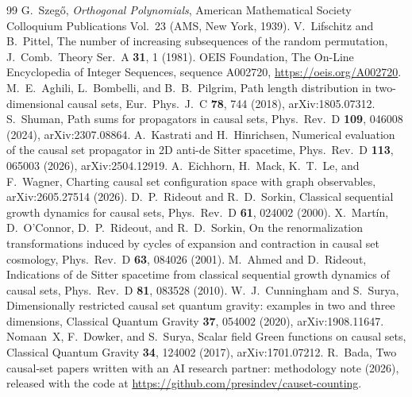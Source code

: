 \documentclass[prd,twocolumn,superscriptaddress,nofootinbib,amsmath,amssymb,floatfix]{revtex4-2}
\begin{document}
\begin{thebibliography}{99}
 G.~Szeg\H{o}, \emph{Orthogonal Polynomials}, American Mathematical Society Colloquium Publications Vol.~23 (AMS, New York, 1939).
 V.~Lifschitz and B.~Pittel, The number of increasing subsequences of the random permutation, J.\ Comb.\ Theory Ser.\ A \textbf{31}, 1 (1981).
 OEIS Foundation, The On-Line Encyclopedia of Integer Sequences, sequence A002720, \url{https://oeis.org/A002720}.
 M.~E.~Aghili, L.~Bombelli, and B.~B.~Pilgrim, Path length distribution in two-dimensional causal sets, Eur.\ Phys.\ J.\ C \textbf{78}, 744 (2018), arXiv:1805.07312.
 S.~Shuman, Path sums for propagators in causal sets, Phys.\ Rev.\ D \textbf{109}, 046008 (2024), arXiv:2307.08864.
 A.~Kastrati and H.~Hinrichsen, Numerical evaluation of the causal set propagator in 2D anti-de Sitter spacetime, Phys.\ Rev.\ D \textbf{113}, 065003 (2026), arXiv:2504.12919.
 A.~Eichhorn, H.~Mack, K.~T.~Le, and F.~Wagner, Charting causal set configuration space with graph observables, arXiv:2605.27514 (2026).
 D.~P.~Rideout and R.~D.~Sorkin, Classical sequential growth dynamics for causal sets, Phys.\ Rev.\ D \textbf{61}, 024002 (2000).
 X.~Mart\'in, D.~O'Connor, D.~P.~Rideout, and R.~D.~Sorkin, On the renormalization transformations induced by cycles of expansion and contraction in causal set cosmology, Phys.\ Rev.\ D \textbf{63}, 084026 (2001).
 M.~Ahmed and D.~Rideout, Indications of de Sitter spacetime from classical sequential growth dynamics of causal sets, Phys.\ Rev.\ D \textbf{81}, 083528 (2010).
 W.~J.~Cunningham and S.~Surya, Dimensionally restricted causal set quantum gravity: examples in two and three dimensions, Classical Quantum Gravity \textbf{37}, 054002 (2020), arXiv:1908.11647.
 Nomaan~X, F.~Dowker, and S.~Surya, Scalar field Green functions on causal sets, Classical Quantum Gravity \textbf{34}, 124002 (2017), arXiv:1701.07212.
 R.~Bada, Two causal-set papers written with an AI research partner: methodology note (2026), released with the code at \url{https://github.com/presindev/causet-counting}.
\end{thebibliography}
\end{document}
